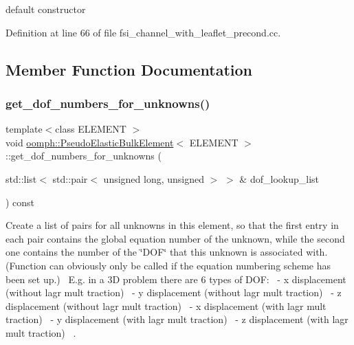 default constructor 



Definition at line 66 of file fsi\+\_\+channel\+\_\+with\+\_\+leaflet\+\_\+precond.\+cc.



\subsection{Member Function Documentation}
\mbox{\label{classoomph_1_1PseudoElasticBulkElement_a8f1dc2011100324953293470a18f3080}} 
\subsubsection{\texorpdfstring{get\+\_\+dof\+\_\+numbers\+\_\+for\+\_\+unknowns()}{get\_dof\_numbers\_for\_unknowns()}}
{\footnotesize\ttfamily template$<$class E\+L\+E\+M\+E\+NT $>$ \\
void \hyperlink{classoomph_1_1PseudoElasticBulkElement}{oomph\+::\+Pseudo\+Elastic\+Bulk\+Element}$<$ E\+L\+E\+M\+E\+NT $>$\+::get\+\_\+dof\+\_\+numbers\+\_\+for\+\_\+unknowns (\begin{DoxyParamCaption}\item[{std\+::list$<$ std\+::pair$<$ unsigned long, unsigned $>$ $>$ \&}]{dof\+\_\+lookup\+\_\+list }\end{DoxyParamCaption}) const\hspace{0.3cm}{\ttfamily [inline]}}



Create a list of pairs for all unknowns in this element, so that the first entry in each pair contains the global equation number of the unknown, while the second one contains the number of the \char`\"{}\+D\+O\+F\char`\"{} that this unknown is associated with. (Function can obviously only be called if the equation numbering scheme has been set up.)~\newline
E.\+g. in a 3D problem there are 6 types of D\+OF\+:~ -\/ x displacement (without lagr mult traction)~ -\/ y displacement (without lagr mult traction)~ -\/ z displacement (without lagr mult traction)~ -\/ x displacement (with lagr mult traction)~ -\/ y displacement (with lagr mult traction)~ -\/ z displacement (with lagr mult traction)~\newline
. 



